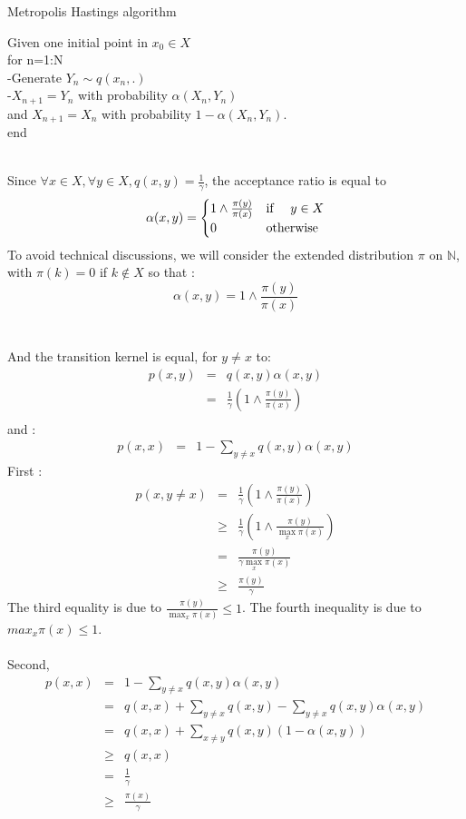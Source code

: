 \begin{algorithm}
	\caption{Metropolis Hastings algorithm}\label{RS}
	Given one initial point in $x_0 \in X$~\\
	for n=1:N~\\
	-Generate $Y_n \sim q(x_n,.) $~\\
	-$X_{n+1}=Y_n$ with probability $\alpha(X_n, Y_n)$~\\
	and $X_{n+1}=X_{n}$ with probability $1-\alpha(X_n, Y_n)$.~\\
	end~\\
\end{algorithm}
~\\
Since $\forall x \in X, \forall y \in X, q(x,y)=\frac{1}{\gamma}$, the acceptance ratio is equal to 
$$
\alpha(x,y) =
\begin{cases}
 1 \wedge \frac{\pi(y)}{\pi(x)} & \text{if \quad }  y \in X\\
 0 & \text{otherwise}
\end{cases}
$$
To avoid technical discussions, we will consider the extended distribution $\pi$ on $\mathbb{N}$, with $\pi(k)=0$ if $k \notin X$ so that :
$$
\alpha(x,y) = 1 \wedge \frac{\pi(y)}{\pi(x)} 
$$
~\\
~\\
And the transition kernel is equal, for $y \neq x$ to:
\begin{eqnarray*}
	p(x,y)&=& q(x,y)\alpha(x,y)\\
		  &=& \frac{1}{\gamma} ( 1 \wedge \frac{\pi(y)}{\pi(x)} ) \\ 	
\end{eqnarray*}
and : 
\begin{eqnarray*}
	p(x,x)&=& 1-\sum_{y \neq x}q(x,y)\alpha(x,y) 	
\end{eqnarray*}
First :
\begin{eqnarray*}
p(x,y \neq x) & = & \frac{1}{\gamma}(1 \wedge \frac{\pi(y)}{\pi(x)})\\
			 & \geq & \frac{1}{\gamma }(1 \wedge \frac{\pi(y)}{\max_x \pi(x)})\\
			 & = &  \frac{\pi(y)}{\gamma \max_x \pi(x)}\\
			 & \geq & 	 \frac{\pi(y)}{\gamma}	 
\end{eqnarray*}
The third equality is due to $\frac{\pi(y)}{\max_x \pi(x)} \leq 1 $.
The fourth inequality is due to $max_x \pi(x) \leq 1$.~\\
~\\
Second, 
\begin{eqnarray*}
	p(x,x)&=& 1-\sum_{y \neq x}q(x,y)\alpha(x,y) \\
	&=& q(x,x)+\sum_{y \neq x}q(x,y) -\sum_{y \neq x}q(x,y)\alpha(x,y)\\
	&=& q(x,x) + \sum_{x \neq y}q(x,y)(1-\alpha(x,y))\\
	& \geq & q(x,x)\\
	& = & \frac{1}{\gamma}\\
	& \geq & \frac{\pi(x)}{\gamma} 
\end{eqnarray*}
